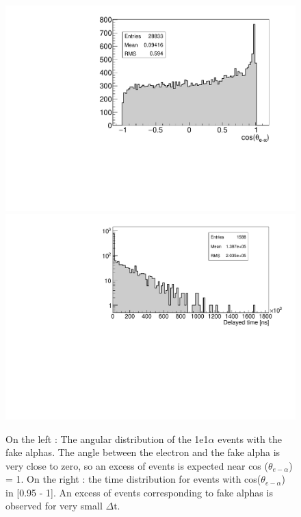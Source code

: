 \documentclass[main.tex]{subfiles}
\begin{document}
\begin{figure}[h!]
\begin{center}
\includegraphics[scale=0.312]{pictures/Chap5/angle.pdf}
\includegraphics[scale=0.38]{pictures/Chap5/delayedTime.pdf}
\caption{On the left : The angular distribution of the 1e1$\alpha$ events with the fake alphas. The angle between the electron and the fake alpha is very close to zero, so an excess of events is expected near cos ($\theta_{e-\alpha}$) = 1. On the right : the time distribution for events with cos($\theta_{e-\alpha}$) in [0.95 - 1]. An excess of events corresponding to fake alphas is observed for very small $\Delta \text{t}$.} 
\label{angularDistribution}
\end{center}
\end{figure}
\end{document}
